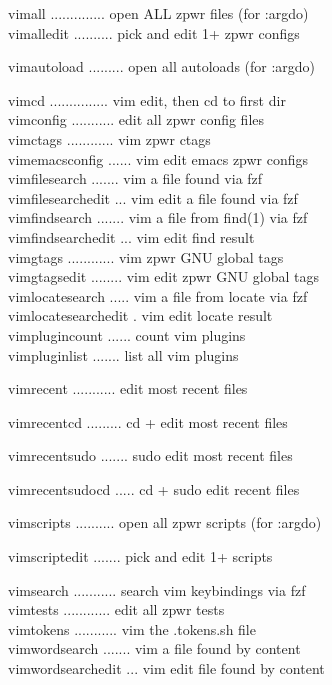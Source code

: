 \documentclass[11pt,a4paper,twoside]{book}
\begin{document}
\begin{codebox}
vimall .............. open ALL zpwr files (for :argdo)\\
vimalledit .......... pick and edit 1+ zpwr configs\\
\end{codebox}

vimautoload ......... open all autoloads (for :argdo)

\begin{codebox}
vimcd ............... vim edit, then cd to first dir\\
vimconfig ........... edit all zpwr config files\\
vimctags ............ vim zpwr ctags\\
vimemacsconfig ...... vim edit emacs zpwr configs\\
vimfilesearch ....... vim a file found via fzf\\
vimfilesearchedit ... vim edit a file found via fzf\\
vimfindsearch ....... vim a file from find(1) via fzf\\
vimfindsearchedit ... vim edit find result\\
vimgtags ............ vim zpwr GNU global tags\\
vimgtagsedit ........ vim edit zpwr GNU global tags\\
vimlocatesearch ..... vim a file from locate via fzf\\
vimlocatesearchedit . vim edit locate result\\
vimplugincount ...... count vim plugins\\
vimpluginlist ....... list all vim plugins\\
\end{codebox}

vimrecent ........... edit most recent files

vimrecentcd ......... cd + edit most recent files

vimrecentsudo ....... sudo edit most recent files

vimrecentsudocd ..... cd + sudo edit recent files

\begin{codebox}
vimscripts .......... open all zpwr scripts (for :argdo)\\
\end{codebox}

vimscriptedit ....... pick and edit 1+ scripts

\begin{codebox}
vimsearch ........... search vim keybindings via fzf\\
vimtests ............ edit all zpwr tests\\
vimtokens ........... vim the .tokens.sh file\\
vimwordsearch ....... vim a file found by content\\
vimwordsearchedit ... vim edit file found by content\\
\end{codebox}
\end{document}
